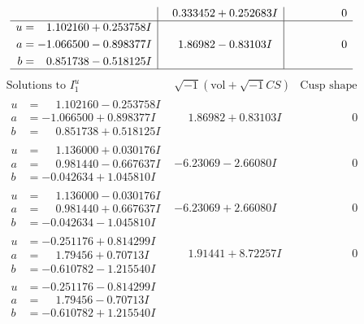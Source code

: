 \documentclass[1p]{elsarticle_modified}
\theoremstyle{definition}
\newcommand{\I}{\sqrt{-1}}
\begin{document}
$$\begin{array}{c|c|c}
 & \phantom{-}0.333452 + 0.252683 I & \phantom{-0.000000 } 0 \\ \hline\begin{aligned}
u &= \phantom{-}1.102160 + 0.253758 I \\
a &= -1.066500 - 0.898377 I \\
b &= \phantom{-}0.851738 - 0.518125 I\end{aligned}
 & \phantom{-}1.86982 - 0.83103 I & \phantom{-0.000000 } 0\\
 \hline 
 \end{array}$$\newpage$$\begin{array}{c|c|c}  
\text{Solutions to }I^u_{1}& \I (\text{vol} + \sqrt{-1}CS) & \text{Cusp shape}\\
 \hline 
\begin{aligned}
u &= \phantom{-}1.102160 - 0.253758 I \\
a &= -1.066500 + 0.898377 I \\
b &= \phantom{-}0.851738 + 0.518125 I\end{aligned}
 & \phantom{-}1.86982 + 0.83103 I & \phantom{-0.000000 } 0 \\ \hline\begin{aligned}
u &= \phantom{-}1.136000 + 0.030176 I \\
a &= \phantom{-}0.981440 - 0.667637 I \\
b &= -0.042634 + 1.045810 I\end{aligned}
 & -6.23069 - 2.66080 I & \phantom{-0.000000 } 0 \\ \hline\begin{aligned}
u &= \phantom{-}1.136000 - 0.030176 I \\
a &= \phantom{-}0.981440 + 0.667637 I \\
b &= -0.042634 - 1.045810 I\end{aligned}
 & -6.23069 + 2.66080 I & \phantom{-0.000000 } 0 \\ \hline\begin{aligned}
u &= -0.251176 + 0.814299 I \\
a &= \phantom{-}1.79456 + 0.70713 I \\
b &= -0.610782 - 1.215540 I\end{aligned}
 & \phantom{-}1.91441 + 8.72257 I & \phantom{-0.000000 } 0 \\ \hline\begin{aligned}
u &= -0.251176 - 0.814299 I \\
a &= \phantom{-}1.79456 - 0.70713 I \\
b &= -0.610782 + 1.215540 I\end{aligned}

\end{array}$$
\end{document}
